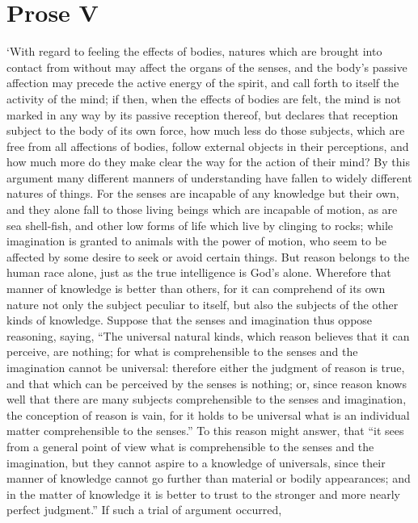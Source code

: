\section*{Prose V}

`With regard to feeling the effects of bodies, natures which are
brought into contact from without may affect the organs of the senses,
and the body's passive affection may precede the active energy of the
spirit, and call forth to itself the activity of the mind; if then,
when the effects of bodies are felt, the mind is not marked in any way
by its passive reception thereof, but declares that reception subject
to the body of its own force, how much less do those subjects, which
are free from all affections of bodies, follow external objects in
their perceptions, and how much more do they make clear the way for
the action of their mind? By this argument many different manners of
understanding have fallen to widely different natures of things. For
the senses are incapable of any knowledge but their own, and they
alone fall to those living beings which are incapable of motion, as
are sea shell-fish, and other low forms of life which live by clinging
to rocks; while imagination is granted to animals with the power of
motion, who seem to be affected by some desire to seek or avoid
certain things.  But reason belongs to the human race alone,
just as the true intelligence is God's alone. Wherefore that manner of
knowledge is better than others, for it can comprehend of its own
nature not only the subject peculiar to itself, but also the subjects
of the other kinds of knowledge. Suppose that the senses and
imagination thus oppose reasoning, saying, ``The universal natural
kinds, which reason believes that it can perceive, are nothing; for
what is comprehensible to the senses and the imagination cannot be
universal: therefore either the judgment of reason is true, and that
which can be perceived by the senses is nothing; or, since reason
knows well that there are many subjects comprehensible to the senses
and imagination, the conception of reason is vain, for it holds to be
universal what is an individual matter comprehensible to the senses.''
To this reason might answer, that ``it sees from a general point of
view what is comprehensible to the senses and the imagination, but
they cannot aspire to a knowledge of universals, since their manner of
knowledge cannot go further than material or bodily appearances; and
in the matter of knowledge it is better to trust to the stronger and
more nearly perfect judgment.'' If such a trial of argument occurred,
